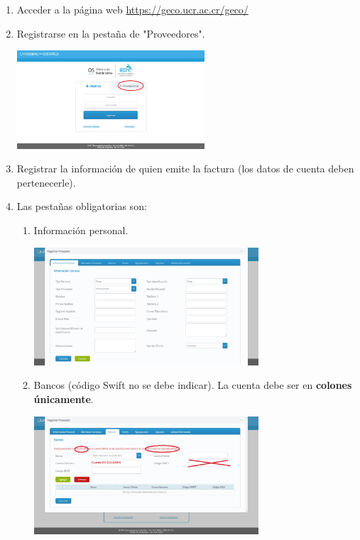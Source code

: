 \documentclass[12pt]{article}
\begin{document}
\begin{enumerate}
    \item Acceder a la página web \textcolor{blue}{\href{https://geco.ucr.ac.cr/geco/}{https://geco.ucr.ac.cr/geco/}}
    \item Registrarse en la pestaña de "Proveedores". 
    \begin{center}
        \includegraphics[width=0.55\textwidth]{Oficios/Circular-SF-2-2021/geco1.jpg}
    \end{center}
    \item Registrar la información de quien emite la factura (los datos de cuenta deben pertenecerle).
    \item Las pestañas obligatorias son: 
    \begin{enumerate}
        \item Información personal.
        \begin{center}
        \includegraphics[width=0.6942\textwidth]{Oficios/Circular-SF-2-2021/geco2.jpg}
    \end{center}
        \item Bancos (código Swift no se debe indicar). La cuenta debe ser en \textbf{colones únicamente}.
        \begin{center}
        \includegraphics[width=0.6942\textwidth]{Oficios/Circular-SF-2-2021/geco3.jpg}

\end{center}
\end{enumerate}
\end{enumerate}
\end{document}
